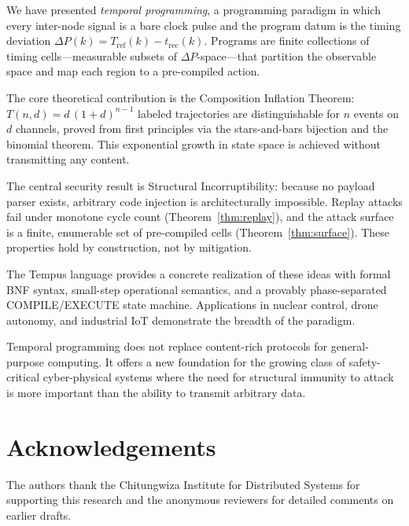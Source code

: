 \documentclass[twocolumn,10pt]{article}
\newcommand{\DP}{\Delta P}          %
\newcommand{\Tref}{T_{\mathrm{ref}}}
\newcommand{\trec}{t_{\mathrm{rec}}}
\begin{document}
We have presented \emph{temporal programming}, a programming paradigm
in which every inter-node signal is a bare clock pulse and the program
datum is the timing deviation $\DP(k) = \Tref(k) - \trec(k)$.
Programs are finite collections of timing cells---measurable subsets
of $\DP$-space---that partition the observable space and map each
region to a pre-compiled action.

The core theoretical contribution is the Composition Inflation
Theorem: $T(n,d) = d\,(1+d)^{n-1}$ labeled trajectories are
distinguishable for $n$ events on $d$ channels, proved from first
principles via the stars-and-bars bijection and the binomial theorem.
This exponential growth in state space is achieved without transmitting
any content.

The central security result is Structural Incorruptibility: because no
payload parser exists, arbitrary code injection is architecturally
impossible. Replay attacks fail under monotone cycle count
(Theorem~\ref{thm:replay}), and the attack surface is a finite,
enumerable set of pre-compiled cells (Theorem~\ref{thm:surface}).
These properties hold by construction, not by mitigation.

The Tempus language provides a concrete realization of these ideas
with formal BNF syntax, small-step operational semantics, and a
provably phase-separated COMPILE/EXECUTE state machine. Applications
in nuclear control, drone autonomy, and industrial IoT demonstrate
the breadth of the paradigm.

Temporal programming does not replace content-rich protocols for
general-purpose computing. It offers a new foundation for the
growing class of safety-critical cyber-physical systems where
the need for structural immunity to attack is more important than
the ability to transmit arbitrary data.

\section*{Acknowledgements}
The authors thank the Chitungwiza Institute for Distributed Systems
for supporting this research and the anonymous reviewers for detailed
comments on earlier drafts.



\end{document}
